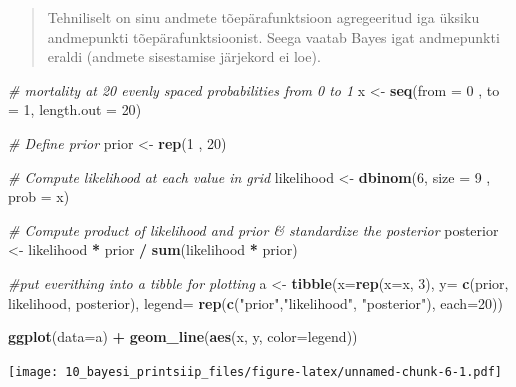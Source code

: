 \documentclass[]{book}
\newenvironment{Shaded}{\begin{snugshade}}{\end{snugshade}}
\newcommand{\CommentTok}[1]{\textcolor[rgb]{0.56,0.35,0.01}{\textit{#1}}}
\newcommand{\DataTypeTok}[1]{\textcolor[rgb]{0.13,0.29,0.53}{#1}}
\newcommand{\DecValTok}[1]{\textcolor[rgb]{0.00,0.00,0.81}{#1}}
\newcommand{\KeywordTok}[1]{\textcolor[rgb]{0.13,0.29,0.53}{\textbf{#1}}}
\newcommand{\NormalTok}[1]{#1}
\newcommand{\OperatorTok}[1]{\textcolor[rgb]{0.81,0.36,0.00}{\textbf{#1}}}
\newcommand{\StringTok}[1]{\textcolor[rgb]{0.31,0.60,0.02}{#1}}
\begin{document}
\begin{quote}
Tehniliselt on sinu andmete tõepärafunktsioon agregeeritud iga üksiku andmepunkti tõepärafunktsioonist. Seega vaatab Bayes igat andmepunkti eraldi (andmete sisestamise järjekord ei loe).
\end{quote}



\begin{Shaded}
\begin{Highlighting}[]
\CommentTok{# mortality at 20 evenly spaced probabilities from 0 to 1}
\NormalTok{x <-}\StringTok{ }\KeywordTok{seq}\NormalTok{(}\DataTypeTok{from =} \DecValTok{0}\NormalTok{ , }\DataTypeTok{to =} \DecValTok{1}\NormalTok{, }\DataTypeTok{length.out =} \DecValTok{20}\NormalTok{)}

\CommentTok{# Define prior}
\NormalTok{prior <-}\StringTok{ }\KeywordTok{rep}\NormalTok{(}\DecValTok{1}\NormalTok{ , }\DecValTok{20}\NormalTok{)}

\CommentTok{# Compute likelihood at each value in grid}
\NormalTok{likelihood <-}\StringTok{ }\KeywordTok{dbinom}\NormalTok{(}\DecValTok{6}\NormalTok{, }\DataTypeTok{size =} \DecValTok{9}\NormalTok{ , }\DataTypeTok{prob =}\NormalTok{ x)}

\CommentTok{# Compute product of likelihood and prior & standardize the posterior}
\NormalTok{posterior <-}\StringTok{ }\NormalTok{likelihood }\OperatorTok{*}\StringTok{ }\NormalTok{prior }\OperatorTok{/}\StringTok{ }\KeywordTok{sum}\NormalTok{(likelihood }\OperatorTok{*}\StringTok{ }\NormalTok{prior)}

\CommentTok{#put everithing into a tibble for plotting}
\NormalTok{a <-}\StringTok{ }\KeywordTok{tibble}\NormalTok{(}\DataTypeTok{x=}\KeywordTok{rep}\NormalTok{(}\DataTypeTok{x=}\NormalTok{x, }\DecValTok{3}\NormalTok{),}
            \DataTypeTok{y=} \KeywordTok{c}\NormalTok{(prior, likelihood, posterior),}
            \DataTypeTok{legend=} \KeywordTok{rep}\NormalTok{(}\KeywordTok{c}\NormalTok{(}\StringTok{"prior"}\NormalTok{,}\StringTok{"likelihood"}\NormalTok{, }\StringTok{"posterior"}\NormalTok{), }\DataTypeTok{each=}\DecValTok{20}\NormalTok{))}

\KeywordTok{ggplot}\NormalTok{(}\DataTypeTok{data=}\NormalTok{a) }\OperatorTok{+}\StringTok{ }\KeywordTok{geom_line}\NormalTok{(}\KeywordTok{aes}\NormalTok{(x, y, }\DataTypeTok{color=}\NormalTok{legend))}
\end{Highlighting}
\end{Shaded}

\texttt{[image: 10\_bayesi\_printsiip\_files/figure-latex/unnamed-chunk-6-1.pdf]}
\end{document}
